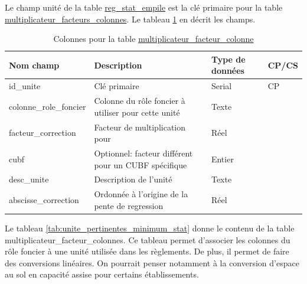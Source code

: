         Le champ unité de la table \underline{reg\_stat\_empile} est la clé primaire pour la table \underline{multiplicateur\_facteurs\_colonnes}. Le tableau \ref{tab:definition_unite} en décrit les champs.\par
        \begin{table}[h]
           \centering
           \begin{tabular}{m{}|m{}m{}m{}}
                \hline
                Nom champ & Description & Type de données & CP/CS  \\
                \hline
                id\_unite & Clé primaire  & Serial & CP \\  
                colonne\_role\_foncier & Colonne du rôle foncier à utiliser pour cette unité & Texte & \\
                facteur\_correction & Facteur de multiplication pour & Réel & \\
                cubf & Optionnel: facteur différent pour un CUBF spécifique & Entier & \\
                desc\_unite & Description de l'unité & Texte & \\
                \rowcolor{red}abscisse\_correction & Ordonnée à l'origine de la pente de regression & Réel &  \\
                \hline
           \end{tabular}
           \caption{Colonnes pour la table \underline{multiplicateur\_facteur\_colonne}}
           \label{tab:definition_unite}
        \end{table}   
        \clearpage
        Le tableau \ref{tab:unite_pertinentes_minimum_stat} donne  le contenu de la table multiplicateur\_facteur\_colonnes. Ce tableau permet d'associer les colonnes du rôle foncier à une unité utilisée dans les règlements. De plus, il permet de faire des conversions linéaires. On pourrait penser notamment à la conversion d'espace au sol en capacité assise pour certains établissements.\par
